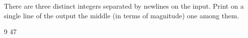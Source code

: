 




There are three distinct integers separated by newlines on the input. Print on a single line of the output the middle (in terms of magnitude) one among them.

9
47
\koniec

